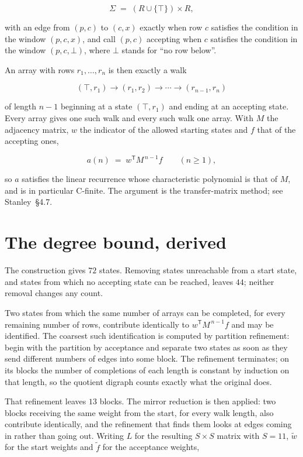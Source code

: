 \documentclass[11pt]{article}
\theoremstyle{definition}
\begin{document}
\[\Sigma \;=\; (R \cup \{\top\}) \times R,\]

with an edge from $(p,c)$ to $(c,x)$ exactly when row $c$ satisfies the condition in the window $(p,c,x)$, and call $(p,c)$ accepting when $c$ satisfies the condition in the window $(p,c,\bot)$, where $\bot$ stands for ``no row below''.

An array with rows $r_1,\dots,r_n$ is then exactly a walk

\[(\top,r_1) \to (r_1,r_2) \to \cdots \to (r_{n-1},r_n)\]

of length $n-1$ beginning at a state $(\top,r_1)$ and ending at an accepting state. Every array gives one such walk and every such walk one array. With $M$ the adjacency matrix, $w$ the indicator of the allowed starting states and $f$ that of the accepting ones,

\[a(n) \;=\; w^{\mathsf T} M^{\,n-1} f \qquad (n \ge 1),\]

so $a$ satisfies the linear recurrence whose characteristic polynomial is that of $M$, and is in particular C-finite. The argument is the transfer-matrix method; see Stanley~\S4.7.

\section{The degree bound, derived}

The construction gives $72$ states. Removing states unreachable from a start state, and states from which no accepting state can be reached, leaves $44$; neither removal changes any count.

Two states from which the same number of arrays can be completed, for every remaining number of rows, contribute identically to $w^{\mathsf T}M^{\,n-1}f$ and may be identified. The coarsest such identification is computed by partition refinement: begin with the partition by acceptance and separate two states as soon as they send different numbers of edges into some block. The refinement terminates; on its blocks the number of completions of each length is constant by induction on that length, so the quotient digraph counts exactly what the original does.

That refinement leaves $13$ blocks. The mirror reduction is then applied: two blocks receiving the same weight from the start, for every walk length, also contribute identically, and the refinement that finds them looks at edges coming in rather than going out. Writing $L$ for the resulting $S \times S$ matrix with $S = 11$, $\tilde w$ for the start weights and $\tilde f$ for the acceptance weights,
\end{document}
